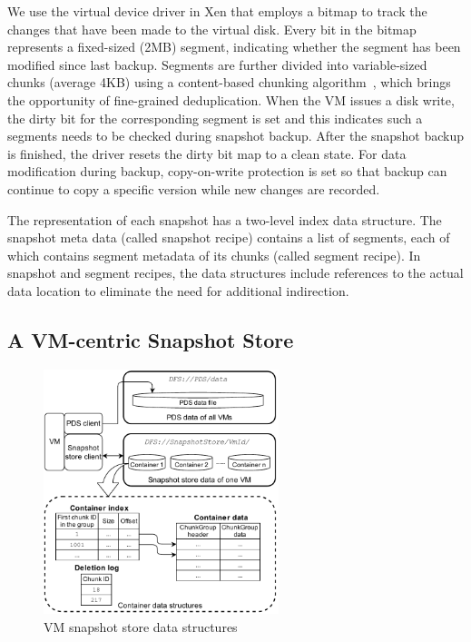 We use the virtual device driver in Xen that employs a bitmap to track the changes 
that have been made to the virtual disk.
Every bit in the bitmap represents a fixed-sized (2MB) segment, indicating whether the segment
has been modified since last backup. 
Segments are further divided into variable-sized chunks (average 4KB) 
using a content-based chunking algorithm~\cite{frame05}, 
which brings the opportunity of fine-grained deduplication.
When the VM issues a disk write, the dirty bit for the corresponding segment is set
and this indicates such a segments needs to be checked during snapshot backup. 
After the snapshot backup is finished, the driver resets the dirty bit map to a clean state.
For data modification during backup, copy-on-write protection is set so that backup can continue to
copy  a specific version while new changes are recorded.

The representation of each snapshot has  a two-level index data structure.
The snapshot meta data (called snapshot recipe) contains a list of segments, each of which contains segment
metadata of its chunks (called segment recipe).
In snapshot and segment recipes, 
the data structures  include references to the actual data location to eliminate the need for additional indirection.


\subsection{A VM-centric Snapshot Store}
\label{sect:store}

\begin{figure}[htbp]
  \centering
  \includegraphics[width=2.7in]{images/sstore_arch}
  \centering
  \caption{VM snapshot store data structures}
  \label{fig:as_arch}
\end{figure}

